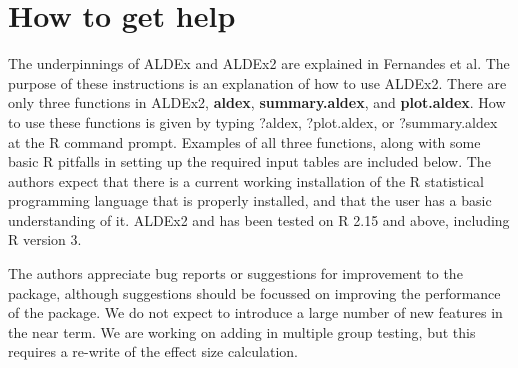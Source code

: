 \documentclass[11pt]{amsart}
\begin{document}
\section{How to get help}
The underpinnings of ALDEx and ALDEx2 are explained in Fernandes et al\cite{fernandes:2013}. The purpose of these instructions is an explanation of how to use ALDEx2. There are only three functions in ALDEx2, {\bf aldex}, {\bf summary.aldex}, and {\bf plot.aldex}. How to use these functions is given by typing ?aldex, ?plot.aldex, or ?summary.aldex at the R command prompt. Examples of all three functions, along with some basic R pitfalls in setting up the required input tables are included below. The authors expect that there is a current working installation of the R statistical programming language that is properly installed, and that the user has a basic understanding of it. ALDEx2 and has been tested on R 2.15 and above, including R version 3.

The authors appreciate bug reports or suggestions for improvement to the package, although suggestions should be focussed on improving the performance of the package. We do not expect to introduce a large number of new features in the near term. We are working on adding in multiple group testing, but this requires a re-write of the effect size calculation.
\end{document}
